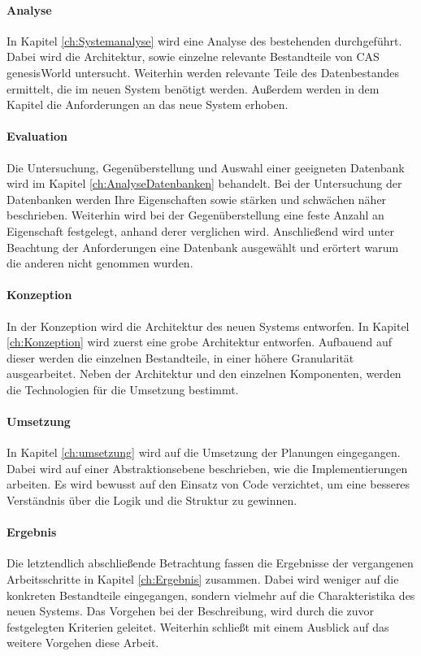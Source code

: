 \paragraph{Analyse} In Kapitel \ref{ch:Systemanalyse} wird eine Analyse des bestehenden durchgeführt. Dabei wird die Architektur, sowie einzelne relevante Bestandteile von CAS genesisWorld untersucht. Weiterhin werden relevante Teile des Datenbestandes ermittelt, die im neuen System benötigt werden. Außerdem werden in dem Kapitel die Anforderungen an das neue System erhoben.

\paragraph{Evaluation} Die Untersuchung, Gegenüberstellung und Auswahl einer geeigneten Datenbank wird im Kapitel \ref{ch:AnalyseDatenbanken} behandelt. Bei der Untersuchung der Datenbanken werden Ihre Eigenschaften sowie stärken und schwächen näher beschrieben. Weiterhin wird bei der Gegenüberstellung eine feste Anzahl an Eigenschaft festgelegt, anhand derer verglichen wird. Anschließend wird unter Beachtung der Anforderungen eine Datenbank ausgewählt und erörtert warum die anderen nicht genommen wurden.  

\paragraph{Konzeption} In der Konzeption wird die Architektur des neuen Systems entworfen. In Kapitel \ref{ch:Konzeption} wird zuerst eine grobe Architektur entworfen. Aufbauend auf dieser werden die einzelnen Bestandteile, in einer höhere Granularität ausgearbeitet. Neben der Architektur und den einzelnen Komponenten, werden die Technologien für die Umsetzung bestimmt. 

\paragraph{Umsetzung} In Kapitel \ref{ch:umsetzung} wird auf die Umsetzung der Planungen eingegangen. Dabei wird auf einer Abstraktionsebene beschrieben, wie die Implementierungen arbeiten. Es wird bewusst auf den Einsatz von Code verzichtet, um eine besseres Verständnis über die Logik und die Struktur zu gewinnen. 

\paragraph{Ergebnis} Die letztendlich abschließende Betrachtung fassen die Ergebnisse der vergangenen Arbeitsschritte in Kapitel \ref{ch:Ergebnis} zusammen. Dabei wird weniger auf die konkreten Bestandteile eingegangen, sondern vielmehr auf die Charakteristika des neuen Systems. Das Vorgehen bei der Beschreibung, wird durch die zuvor festgelegten Kriterien geleitet. Weiterhin schließt mit einem Ausblick auf das weitere Vorgehen diese Arbeit. 

